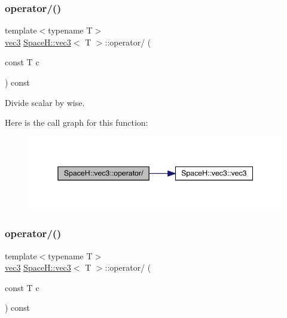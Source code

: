 \subsubsection{\texorpdfstring{operator/()}{operator/()}\hspace{0.1cm}{\footnotesize\ttfamily [6/7]}}
{\footnotesize\ttfamily template$<$typename T$>$ \\
\mbox{\hyperlink{struct_space_h_1_1vec3}{vec3}} \mbox{\hyperlink{struct_space_h_1_1vec3}{Space\+H\+::vec3}}$<$ T $>$\+::operator/ (\begin{DoxyParamCaption}\item[{const T}]{c }\end{DoxyParamCaption}) const\hspace{0.3cm}{\ttfamily [inline]}}



Divide scalar by wise. 

Here is the call graph for this function\+:
\nopagebreak
\begin{figure}[H]
\begin{center}
\leavevmode
\includegraphics[width=345pt]{struct_space_h_1_1vec3_af3f90f3a0f92d6ee7bd8b413b14d2aaf_cgraph}
\end{center}
\end{figure}
\mbox{\label{struct_space_h_1_1vec3_af3f90f3a0f92d6ee7bd8b413b14d2aaf}} 
\subsubsection{\texorpdfstring{operator/()}{operator/()}\hspace{0.1cm}{\footnotesize\ttfamily [7/7]}}
{\footnotesize\ttfamily template$<$typename T$>$ \\
\mbox{\hyperlink{struct_space_h_1_1vec3}{vec3}} \mbox{\hyperlink{struct_space_h_1_1vec3}{Space\+H\+::vec3}}$<$ T $>$\+::operator/ (\begin{DoxyParamCaption}\item[{const T}]{c }\end{DoxyParamCaption}) const\hspace{0.3cm}{\ttfamily [inline]}}



